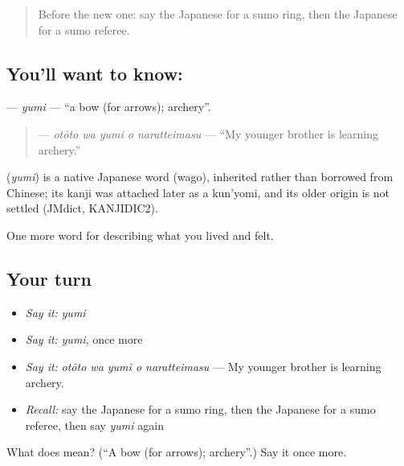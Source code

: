 \label{lesson:JA-C505-yumi}



\begin{quote}
Before the new one: say the Japanese for a sumo ring, then the Japanese for a sumo referee.
\end{quote}

\subsection*{You'll want to know: }
\textbf{} — \emph{yumi} — \textquotedblleft{}a bow (for arrows); archery\textquotedblright{}.

\begin{quote}
\textbf{  } — \emph{otōto wa yumi o naratteimasu} — \textquotedblleft{}My younger brother is learning archery.\textquotedblright{}
\end{quote}

\begin{cousinweb}
\textbf{} (\emph{yumi}) is a native Japanese word (wago), inherited rather than borrowed from Chinese; its kanji was attached later as a kun'yomi, and its older origin is not settled (JMdict, KANJIDIC2).
\end{cousinweb}

\begin{grammarlens}[title={What you've built}]
One more word for describing what you lived and felt.
\end{grammarlens}

\subsection*{Your turn}
\begin{itemize}
\raggedright
  \item \emph{Say it:} \emph{yumi}
  \item \emph{Say it:} \emph{yumi}, once more
  \item \emph{Say it:} \emph{otōto wa yumi o naratteimasu} — My younger brother is learning archery.
  \item \emph{Recall:} say the Japanese for a sumo ring, then the Japanese for a sumo referee, then say \emph{yumi} again
\end{itemize}

\begin{tcolorbox}[breakable,colback=teal!4,colframe=teal!35!black,title={Before you move on}]
What does  mean? (\textquotedblleft{}A bow (for arrows); archery\textquotedblright{}.) Say it once more.
\end{tcolorbox}
